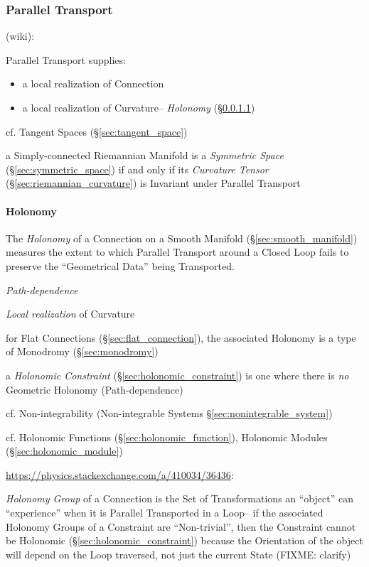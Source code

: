 \subsubsection{Parallel Transport}\label{sec:parallel_transport}

(wiki):

Parallel Transport supplies:
\begin{itemize}
  \item a local realization of Connection
  \item a local realization of Curvature-- \emph{Holonomy}
    (\S\ref{sec:holonomy})
\end{itemize}

\fist cf. Tangent Spaces (\S\ref{sec:tangent_space})

a Simply-connected Riemannian Manifold is a \emph{Symmetric Space}
(\S\ref{sec:symmetric_space}) if and only if its \emph{Curvature Tensor}
(\S\ref{sec:riemannian_curvature}) is Invariant under Parallel Transport



\paragraph{Holonomy}\label{sec:holonomy}\hfill

The \emph{Holonomy} of a Connection on a Smooth Manifold
(\S\ref{sec:smooth_manifold}) measures the extent to which Parallel Transport
around a Closed Loop fails to preserve the ``Geometrical Data'' being
Transported.

\emph{Path-dependence}

\emph{Local realization} of Curvature

for Flat Connections (\S\ref{sec:flat_connection}), the associated Holonomy is
a type of Monodromy (\S\ref{sec:monodromy})

a \emph{Holonomic Constraint} (\S\ref{sec:holonomic_constraint}) is one where
there is \emph{no} Geometric Holonomy (Path-dependence)

cf. Non-integrability (Non-integrable Systems \S\ref{sec:nonintegrable_system})

\fist cf. Holonomic Functions (\S\ref{sec:holonomic_function}), Holonomic
Modules (\S\ref{sec:holonomic_module})

\url{https://physics.stackexchange.com/a/410034/36436}:

\emph{Holonomy Group} of a Connection is the Set of Transformations an
``object'' can ``experience'' when it is Parallel Transported in a Loop-- if
the associated Holonomy Groups of a Constraint are ``Non-trivial'', then the
Constraint cannot be Holonomic (\S\ref{sec:holonomic_constraint}) because the
Orientation of the object will depend on the Loop traversed, not just the
current State (FIXME: clarify)



